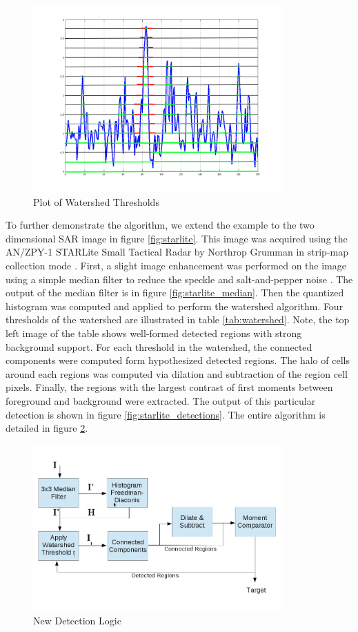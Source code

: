 \documentclass[journal]{IEEEtran}
\begin{document}
\begin{figure}[!h]
\centering
\includegraphics[width=3.75in]{../images/hrr_thresh.png}
\caption{Plot of Watershed Thresholds}
\label{fig:watershed}
\end{figure}

\par To further demonstrate the algorithm, we extend the example to the two dimensional SAR image in figure \ref{fig:starlite}. This image was acquired using the AN/ZPY-1 STARLite Small Tactical Radar by Northrop Grumman in strip-map collection mode \cite{northrop}. First, a slight image enhancement was performed on the image using a simple median filter to reduce the speckle and salt-and-pepper noise \cite[p.~156-157]{gonzalez}. The output of the median filter is in figure \ref{fig:starlite_median}. Then the quantized histogram was computed and applied to perform the watershed algorithm. Four thresholds of the watershed are illustrated in table \ref{tab:watershed}. Note, the top left image of the table shows well-formed detected regions with strong background support. For each threshold in the watershed, the connected components were computed form hypothesized detected regions. The halo of cells around each regions was computed via dilation and subtraction of the region cell pixels. Finally, the regions with the largest contrast of first moments between foreground and background were extracted. The output of this particular detection is shown in figure \ref{fig:starlite_detections}. The entire algorithm is detailed in figure \ref{fig:algorithm}.

\begin{figure}[!h]
\centering
\includegraphics[width=3.75in]{../images/algorithm.png}
\caption{New Detection Logic}
\label{fig:algorithm}
\end{figure}
\end{document}
